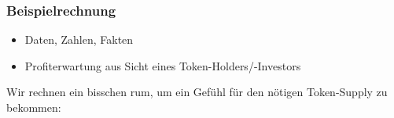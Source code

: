 

\subsubsection{Beispielrechnung}
\vspace{0.2cm}


\begin{itemize}
	\item Daten, Zahlen, Fakten
	\item Profiterwartung aus Sicht eines Token-Holders/-Investors
\end{itemize}

\vspace{0.5cm}

Wir rechnen ein bisschen rum, um ein Gefühl für den nötigen Token-Supply zu bekommen:

\vspace{0.3cm}

